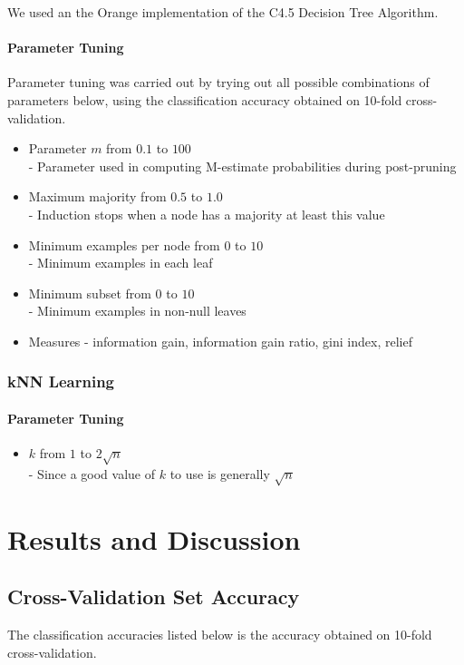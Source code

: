 \documentclass[]{article}
\begin{document}
We used an the Orange implementation of the C4.5 Decision Tree Algorithm.

\paragraph{Parameter Tuning}
Parameter tuning was carried out by trying out all possible combinations of parameters below, using the classification accuracy obtained on 10-fold cross-validation.

\begin{itemize}
	\item Parameter $m$ from $0.1$ to $100$ \\
		- Parameter used in computing M-estimate probabilities during post-pruning
	\item Maximum majority from $0.5$ to $1.0$ \\
		- Induction stops when a node has a majority at least this value
	\item Minimum examples per node from $0$ to $10$ \\
		- Minimum examples in each leaf
	\item Minimum subset from $0$ to $10$ \\
		- Minimum examples in non-null leaves
	\item Measures - information gain, information gain ratio, gini index, relief %
\end{itemize}

\subsubsection{kNN Learning}

\paragraph{Parameter Tuning}
\begin{itemize}
	\item $k$ from $1$ to $2\sqrt{n}$ \\
		- Since a good value of $k$ to use is generally $\sqrt{n}$
\end{itemize}

\section{Results and Discussion}

\subsection{Cross-Validation Set Accuracy}
The classification accuracies listed below is the accuracy obtained on 10-fold cross-validation.
\end{document}

